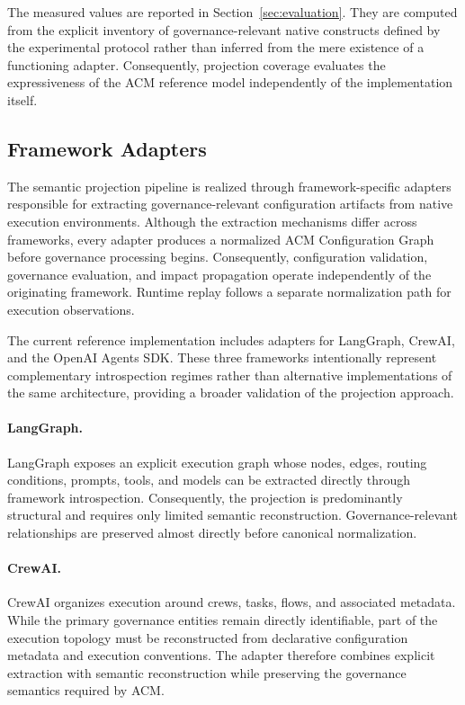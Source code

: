 \documentclass[10pt]{article}
\begin{document}
The measured values are reported in Section~\ref{sec:evaluation}. They are computed from the explicit inventory of governance-relevant native constructs defined by the experimental protocol rather than inferred from the mere existence of a functioning adapter. Consequently, projection coverage evaluates the expressiveness of the ACM reference model independently of the implementation itself.


\subsection{Framework Adapters}
\label{sec:framework_adapters}

The semantic projection pipeline is realized through framework-specific adapters responsible for extracting governance-relevant configuration artifacts from native execution environments. Although the extraction mechanisms differ across frameworks, every adapter produces a normalized ACM Configuration Graph before governance processing begins. Consequently, configuration validation, governance evaluation, and impact propagation operate independently of the originating framework. Runtime replay follows a separate normalization path for execution observations.

The current reference implementation includes adapters for LangGraph, CrewAI, and the OpenAI Agents SDK. These three frameworks intentionally represent complementary introspection regimes rather than alternative implementations of the same architecture, providing a broader validation of the projection approach.

\paragraph{LangGraph.}

LangGraph exposes an explicit execution graph whose nodes, edges, routing conditions, prompts, tools, and models can be extracted directly through framework introspection. Consequently, the projection is predominantly structural and requires only limited semantic reconstruction. Governance-relevant relationships are preserved almost directly before canonical normalization.

\paragraph{CrewAI.}

CrewAI organizes execution around crews, tasks, flows, and associated metadata. While the primary governance entities remain directly identifiable, part of the execution topology must be reconstructed from declarative configuration metadata and execution conventions. The adapter therefore combines explicit extraction with semantic reconstruction while preserving the governance semantics required by ACM.
\end{document}
